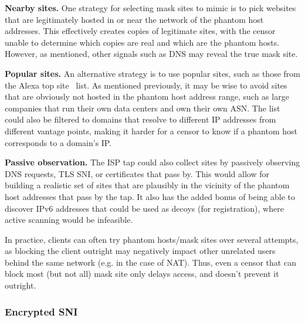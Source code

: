 \documentclass[sigconf,anonymous]{acmart}
\renewcommand{\paragraph}[1]{\smallskip\noindent\textbf{#1\quad}}
\begin{document}
\paragraph{Nearby sites.}
One strategy for selecting mask sites to mimic is to pick websites that are
legitimately hosted in or near the network of the phantom host addresses. This
effectively creates copies of legitimate sites, with the censor unable to
determine which copies are real and which are the phantom hosts. However, as
mentioned, other signals such as DNS may reveal the true mask site.

\paragraph{Popular sites.}
An alternative strategy is to use popular sites, such as those from the Alexa
top site~\cite{alexa-top500} list. As mentioned previously, it may be wise to avoid
sites that are obviously not hosted in the phantom host address range, such as
large companies that run their own data centers and own their own ASN.
The list could also be filtered to domains that resolve to different IP
addresses from different vantage points, making it harder for a censor to know
if a phantom host corresponds to a domain's IP.

\paragraph{Passive observation.}
The ISP tap could also collect sites by passively observing DNS requests, TLS
SNI, or certificates that pass by. This would allow for building a realistic set
of sites that are plausibly in the vicinity of the phantom host addresses
that pass by the tap. It also has the added bonus of being able to discover
IPv6 addresses that could be used as decoys (for registration), where active
scanning would be infeasible.

In practice, clients can often try phantom hosts/mask sites over
several attempts, as blocking the client outright may negatively impact other
unrelated users behind the same network (e.g. in the case of NAT). Thus, even a
censor that can block most (but not all) mask site only delays access, and
doesn't prevent it outright.

\subsubsection{Encrypted SNI}
\label{esni}
\end{document}
